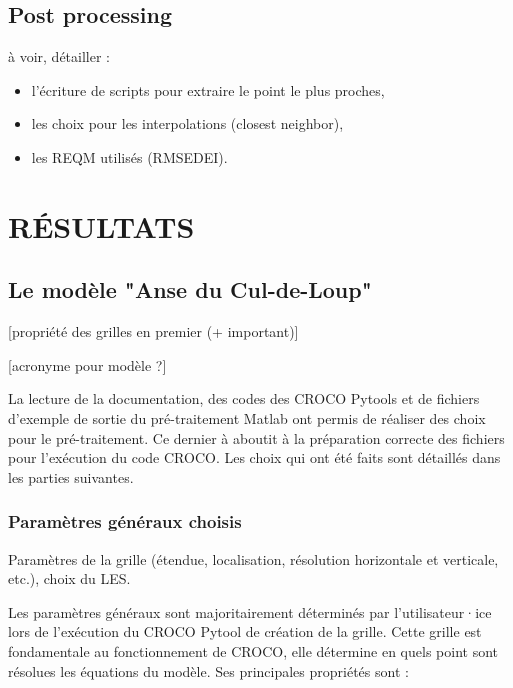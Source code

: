 \documentclass[10pt,a4paper,titlepage]{article}
\begin{document}
\subsection{Post processing}
\label{sub:postpro}
à voir, détailler :
\begin{itemize}
    \item l'écriture de scripts pour extraire le point le plus proches,
    \item les choix pour les interpolations (closest neighbor),
    \item les REQM utilisés (RMSEDEI).
\end{itemize}


\newpage
\section{RÉSULTATS}
\label{sec:resultats}


\subsection{Le modèle "Anse du Cul-de-Loup"}
\label{sub:modele_ADCL}

[propriété des grilles en premier (+ important)]

[acronyme pour modèle ?]


La lecture de la documentation, des codes des CROCO Pytools et de fichiers d'exemple de sortie du pré-traitement Matlab ont permis de réaliser des choix pour le pré-traitement.
Ce dernier à aboutit à la préparation correcte des fichiers pour l'exécution du code CROCO.
Les choix qui ont été faits sont détaillés dans les parties suivantes.


\subsubsection{Paramètres généraux choisis}
\label{subsub:param_generaux}
{\color{lightgrey}
    Paramètres de la grille (étendue, localisation, résolution horizontale et verticale, etc.), choix du LES.
}

Les paramètres généraux sont majoritairement déterminés par l'utilisateur·ice lors de l'exécution du CROCO Pytool de création de la grille.
Cette grille est fondamentale au fonctionnement de CROCO, elle détermine en quels point sont résolues les équations du modèle. Ses principales propriétés sont :
\end{document}
